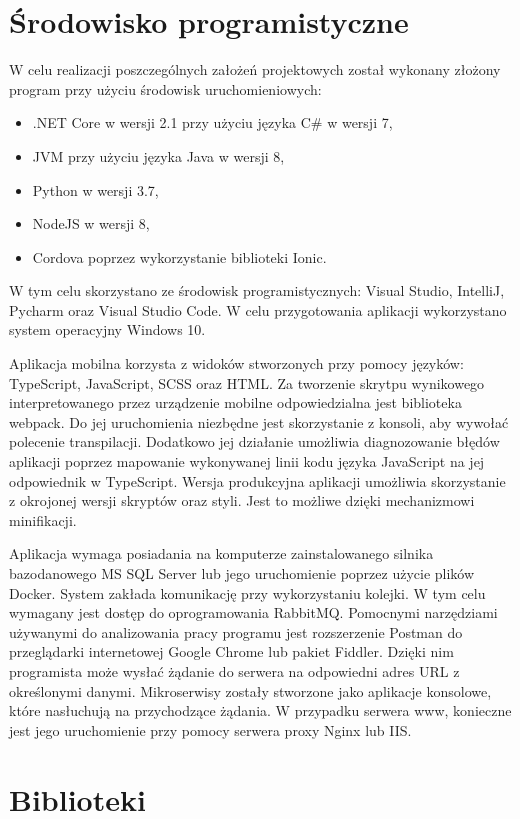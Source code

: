 \section{Środowisko programistyczne}
W celu realizacji poszczególnych założeń projektowych został wykonany złożony program przy użyciu środowisk uruchomieniowych: 
\begin{itemize}[noitemsep]
	\item .NET Core w wersji 2.1 przy użyciu języka C\# w wersji 7,
	\item JVM przy użyciu języka Java w wersji 8,
	\item Python w wersji 3.7,
	\item NodeJS w wersji 8,
	\item Cordova poprzez wykorzystanie biblioteki Ionic.
\end{itemize}
W tym celu skorzystano ze środowisk programistycznych: Visual Studio, IntelliJ, Pycharm oraz Visual Studio Code. W celu przygotowania aplikacji wykorzystano system operacyjny Windows 10.

Aplikacja mobilna korzysta z widoków stworzonych przy pomocy języków: TypeScript, JavaScript, SCSS oraz HTML. Za tworzenie skrytpu wynikowego interpretowanego przez urządzenie mobilne odpowiedzialna jest biblioteka webpack. Do jej uruchomienia niezbędne jest skorzystanie z konsoli, aby wywołać polecenie transpilacji. Dodatkowo jej działanie umożliwia diagnozowanie błędów aplikacji poprzez mapowanie wykonywanej linii kodu języka JavaScript na jej odpowiednik w TypeScript. Wersja produkcyjna aplikacji umożliwia skorzystanie z okrojonej wersji skryptów oraz styli. Jest to możliwe dzięki mechanizmowi minifikacji.

Aplikacja wymaga posiadania na komputerze zainstalowanego silnika bazodanowego MS SQL Server lub jego uruchomienie poprzez użycie plików Docker. System zakłada komunikację przy wykorzystaniu kolejki. W tym celu wymagany jest dostęp do oprogramowania RabbitMQ. Pomocnymi narzędziami używanymi do analizowania pracy programu jest rozszerzenie Postman\cite{Postman} do przeglądarki internetowej Google Chrome lub pakiet Fiddler\cite{Fiddler}. Dzięki nim programista może wysłać żądanie do serwera na odpowiedni adres URL z określonymi danymi. Mikroserwisy zostały stworzone jako aplikacje konsolowe, które nasłuchują na przychodzące żądania. W przypadku serwera www, konieczne jest jego uruchomienie przy pomocy serwera proxy Nginx lub IIS.


\section{Biblioteki}

